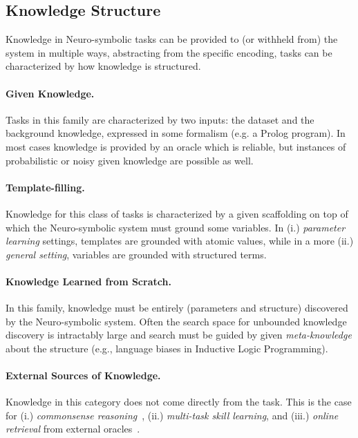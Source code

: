 \subsection{Knowledge Structure}
Knowledge in Neuro-symbolic tasks can be provided to (or withheld from) the system in multiple ways, abstracting from the specific encoding, tasks can be characterized by how knowledge is structured. %

\paragraph{Given Knowledge.} Tasks in this family are characterized by two inputs: the dataset and the background knowledge, expressed in some formalism (e.g. a Prolog program). In most cases knowledge is provided by an oracle which is reliable, but instances of probabilistic or noisy given knowledge are possible as well.

\paragraph{Template-filling.} Knowledge for this class of tasks is characterized by a given scaffolding on top of which the Neuro-symbolic system must ground some variables. %
In (i.) \textit{parameter learning} settings, templates are grounded with atomic values, while in a more (ii.) \textit{general setting}, variables are grounded with structured terms.

\paragraph{Knowledge Learned from Scratch.} In this family, knowledge must be entirely (parameters and structure) discovered by the Neuro-symbolic system. Often the search space for unbounded knowledge discovery is intractably large and search must be guided by given \textit{meta-knowledge} about the structure (e.g., language biases in Inductive Logic Programming).

\paragraph{External Sources of Knowledge.} Knowledge in this category does not come directly from the task. This is the case for (i.) \textit{commonsense reasoning}~\cite{arabshahi2021conversational}, (ii.) \textit{multi-task skill learning}, and (iii.) \textit{online retrieval} from external oracles~\cite{chen2021web}.

